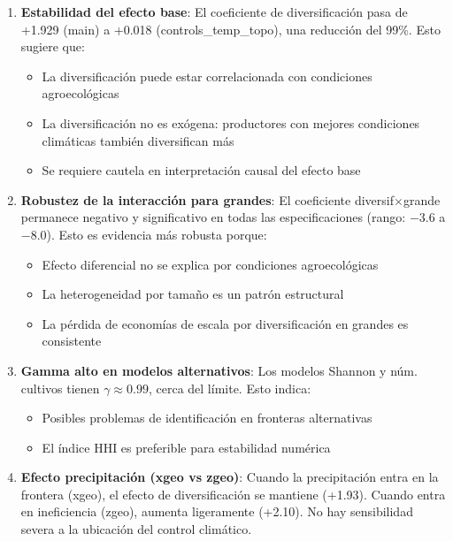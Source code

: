 \documentclass[11pt,a4paper]{article}
\begin{document}
\begin{enumerate}
    \item \textbf{Estabilidad del efecto base}: El coeficiente de diversificación pasa de +1.929 (main) a +0.018 (controls\_temp\_topo), una reducción del 99\%. Esto sugiere que:
    \begin{itemize}
        \item La diversificación puede estar correlacionada con condiciones agroecológicas
        \item La diversificación no es exógena: productores con mejores condiciones climáticas también diversifican más
        \item Se requiere cautela en interpretación causal del efecto base
    \end{itemize}
    
    \item \textbf{Robustez de la interacción para grandes}: El coeficiente diversif$\times$grande permanece negativo y significativo en todas las especificaciones (rango: $-$3.6 a $-$8.0). Esto es evidencia más robusta porque:
    \begin{itemize}
        \item Efecto diferencial no se explica por condiciones agroecológicas
        \item La heterogeneidad por tamaño es un patrón estructural
        \item La pérdida de economías de escala por diversificación en grandes es consistente
    \end{itemize}
    
    \item \textbf{Gamma alto en modelos alternativos}: Los modelos Shannon y núm. cultivos tienen $\gamma \approx 0.99$, cerca del límite. Esto indica:
    \begin{itemize}
        \item Posibles problemas de identificación en fronteras alternativas
        \item El índice HHI es preferible para estabilidad numérica
    \end{itemize}
    
    \item \textbf{Efecto precipitación (xgeo vs zgeo)}: Cuando la precipitación entra en la frontera (xgeo), el efecto de diversificación se mantiene (+1.93). Cuando entra en ineficiencia (zgeo), aumenta ligeramente (+2.10). No hay sensibilidad severa a la ubicación del control climático.
\end{enumerate}
\end{document}
